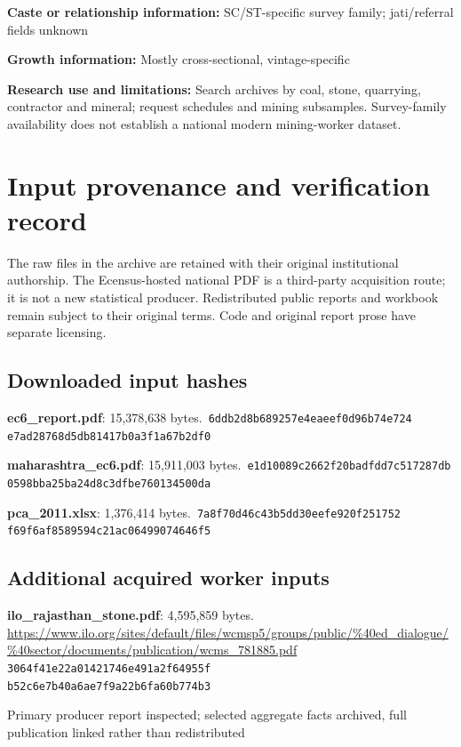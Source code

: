 \documentclass[11pt,a4paper]{report}
\begin{document}
\textbf{Caste or relationship information:} SC/\allowbreak{}ST-specific survey family; jati/\allowbreak{}referral fields unknown

\textbf{Growth information:} Mostly cross-sectional, vintage-specific

\textbf{Research use and limitations:} Search archives by coal, stone, quarrying, contractor and mineral; request schedules and mining subsamples. Survey-family availability does not establish a national modern mining-worker dataset.

\chapter{Input provenance and verification record}
The raw files in the archive are retained with their original institutional authorship. The Ecensus-hosted national PDF is a third-party acquisition route; it is not a new statistical producer. Redistributed public reports and workbook remain subject to their original terms. Code and original report prose have separate licensing.
\section{Downloaded input hashes}
\textbf{ec6\_report.pdf}: 15,378,638 bytes.\
\texttt{6ddb2d8b689257e4eaeef0d96b74e724}\\\texttt{e7ad28768d5db81417b0a3f1a67b2df0}

\textbf{maharashtra\_ec6.pdf}: 15,911,003 bytes.\
\texttt{e1d10089c2662f20badfdd7c517287db}\\\texttt{0598bba25ba24d8c3dfbe760134500da}

\textbf{pca\_2011.xlsx}: 1,376,414 bytes.\
\texttt{7a8f70d46c43b5dd30eefe920f251752}\\\texttt{f69f6af8589594c21ac06499074646f5}

\section{Additional acquired worker inputs}
\textbf{ilo\_rajasthan\_stone.pdf}: 4,595,859 bytes. \url{https://www.ilo.org/sites/default/files/wcmsp5/groups/public/%40ed_dialogue/%40sector/documents/publication/wcms_781885.pdf}\\
\texttt{3064f41e22a01421746e491a2f64955f}\\\texttt{b52c6e7b40a6ae7f9a22b6fa60b774b3}

Primary producer report inspected; selected aggregate facts archived, full publication linked rather than redistributed
\end{document}

